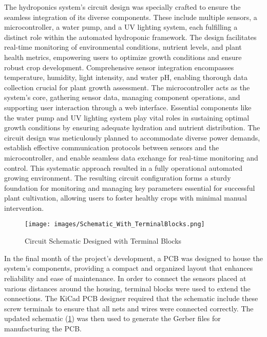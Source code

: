 \documentclass[12pt]{article} %
\begin{document}
\noindent The hydroponics system's circuit design was specially crafted to ensure the seamless integration of its diverse components. These include multiple sensors, a microcontroller, a water pump, and a UV lighting system, each fulfilling a distinct role within the automated hydroponic framework. The design facilitates real-time monitoring of environmental conditions, nutrient levels, and plant health metrics, empowering users to optimize growth conditions and ensure robust crop development.
\newline
\newline
\noindent Comprehensive sensor integration encompasses temperature, humidity, light intensity, and water pH, enabling thorough data collection crucial for plant growth assessment. The microcontroller acts as the system's core, gathering sensor data, managing component operations, and supporting user interaction through a web interface. Essential components like the water pump and UV lighting system play vital roles in sustaining optimal growth conditions by ensuring adequate hydration and nutrient distribution.
\newline
\newline
\noindent The circuit design was meticulously planned to accommodate diverse power demands, establish effective communication protocols between sensors and the microcontroller, and enable seamless data exchange for real-time monitoring and control. This systematic approach resulted in a fully operational automated growing environment. The resulting circuit configuration forms a sturdy foundation for monitoring and managing key parameters essential for successful plant cultivation, allowing users to foster healthy crops with minimal manual intervention.
\begin{figure}[H]
    \centering
    \texttt{[image: images/Schematic\_With\_TerminalBlocks.png]}
    \caption{Circuit Schematic Designed with Terminal Blocks}
    \label{fig:Schem_TerminalBlocks}
\end{figure}
\noindent In the final month of the project's development, a PCB was designed to house the system's components, providing a compact and organized layout that enhances reliability and ease of maintenance. In order to connect the sensors placed at various distances around the housing, terminal blocks were used to extend the connections. The KiCad PCB designer required that the schematic include these screw terminals to ensure that all nets and wires were connected correctly. The updated schematic (\ref{fig:Schem_TerminalBlocks}) was then used to generate the Gerber files for manufacturing the PCB.
\end{document}
